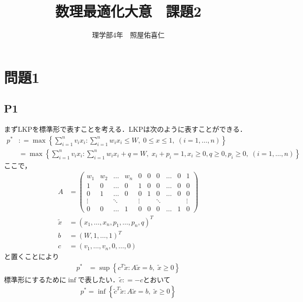 \documentclass[a4j,uplatex]{jsarticle}
\title{数理最適化大意　課題2}
\author{理学部4年　照屋佑喜仁}
\theoremstyle{definition}
\def\coloneqq{\mathrel{\mathop:}=}%
\begin{document}
\maketitle
\section{問題1}
\subsection{P1}
まずLKPを標準形で表すことを考える．LKPは次のように表すことができる．
\begin{align*}
    p^* & \coloneqq \max \left\{\sum_{i=1}^{n}v_ix_i:\sum_{i=1}^{n}w_ix_i\leq W,\; 0\leq x\leq 1,\;(i=1,\dots,n)\right\}         \\
        & =\max\left\{\sum_{i=1}^{n}v_ix_i:\sum_{i=1}^{n}w_ix_i+q=W,\;x_i+p_i=1,x_i\geq0,q\geq0,p_i\geq0,\;(i=1,\dots,n)\right\}
\end{align*}
ここで，
\begin{align*}
    A         & =\begin{pmatrix}
                     w_1    & w_2 & \dots  & w_n & 0      & 0 & 0      & \dots & 0 & 1      \\
                     1      & 0   & \dots  & 0   & 1      & 0 & 0      & \dots & 0 & 0      \\
                     0      & 1   & \dots  & 0   & 0      & 1 & 0      & \dots & 0 & 0      \\
                     \vdots &     & \ddots &     & \vdots &   & \ddots &       &   & \vdots \\
                     0      & 0   & \dots  & 1   & 0      & 0 & 0      & \dots & 1 & 0
                 \end{pmatrix} \\
    \tilde{x} & =(x_1,\dots,x_n,p_1,\dots,p_n,q)^T                                      \\
    b         & =(W,1,\dots,1)^T                                                        \\
    c         & =(v_1,\dots,v_n,0,\dots,0)
\end{align*}
と置くことにより
\begin{align*}
    p^* & =\sup\left\{c^T\tilde{x}:A\tilde{x}=b,\;\tilde{x}\geq0\right\}
\end{align*}
標準形にするために$\inf$で表したい．$\tilde{c}\coloneqq -c$とおいて
\begin{align*}
    p^*=\inf\left\{\tilde{c}^T\tilde{x}:A\tilde{x}=b,\;\tilde{x}\geq0\right\}\tag{1}
\end{align*}
\end{document}
